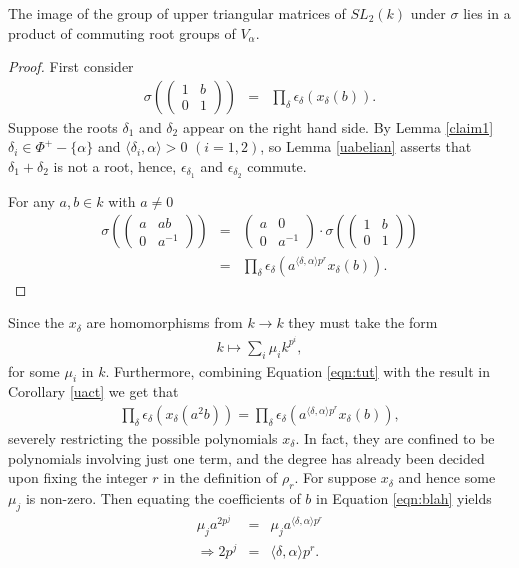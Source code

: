 \begin{corollary} The image of the group of upper triangular matrices of $SL_2(k)$ under $\sigma$ lies in a product of commuting root groups of $V_\alpha$.
  \label{cor:im_ab}
\end{corollary}
\begin{proof}
First consider
\begin{eqnarray*}
\sigma\left(\left( \begin{matrix} 1 & b \\ 0 & 1 \end{matrix}\right)\right) &=& \prod_\delta \epsilon_\delta\left(x_\delta(b)\right).
\end{eqnarray*}
Suppose the roots $\delta_1$ and $\delta_2$ appear on the right hand side. By Lemma \ref{claim1} $\delta_i \in \Phi^+ - \{\alpha\}$ and $\langle \delta_i, \alpha \rangle > 0$ $(i=1,2)$, so Lemma \ref{uabelian} asserts that $\delta_1 + \delta_2$ is not a root, hence, $\epsilon_{\delta_1}$ and $\epsilon_{\delta_2}$ commute. 

For any $a, b\in k$ with $a\neq 0$
\begin{eqnarray*}
\sigma\left(\left(\begin{matrix} a & ab \\ 0 & a^{-1}\end{matrix}\right)\right) 
&=& \left(\begin{matrix} a & 0 \\ 0 & a^{-1}\end{matrix} \right) \cdot
\sigma\left(\left(\begin{matrix} 1 & b \\ 0 & 1\end{matrix}\right)\right) \\
&=& \prod_\delta \epsilon_\delta\left(a^{\langle \delta, \alpha \rangle p^r}x_\delta\left(b\right)\right).
\end{eqnarray*}
\end
{proof}

Since the $x_\delta$ are homomorphisms from $k\rightarrow k$ they must take the form
\begin{eqnarray*}
k\mapsto\sum_i \mu_i k^{p^i},
\end{eqnarray*}
for some $\mu_i$ in $k$. Furthermore, combining Equation \ref{eqn:tut} with the result in Corollary \ref{uact} we get that
\begin{eqnarray}
\prod_\delta \epsilon_\delta\left(x_\delta\left(a^2b\right)\right) = \prod_\delta \epsilon_\delta\left(a^{\langle \delta, \alpha \rangle p^r}x_\delta\left(b\right)\right),
\label{eqn:blah}
\end{eqnarray}
severely restricting the possible polynomials $x_\delta$. In fact, they are confined to be polynomials involving just one term, and the degree has already been decided upon fixing the integer $r$ in the definition of $\rho_r$. For suppose $x_\delta$ and hence some $\mu_j$ is non-zero. Then equating the coefficients of $b$ in Equation \ref{eqn:blah} yields
\begin{eqnarray*}
\mu_ja^{2p^j} &=& \mu_j a^{\langle \delta, \alpha \rangle p^r}\\
\Longrightarrow2p^j &=& \langle \delta, \alpha \rangle p^r.
\end{eqnarray*}

